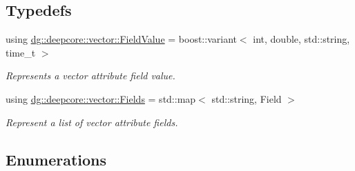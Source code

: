 \subsection*{Typedefs}
\begin{DoxyCompactItemize}
\item 
using \hyperlink{group___vector_module_ga4b8ce414fd5c655308a07474c35828c0}{dg\+::deepcore\+::vector\+::\+Field\+Value} = boost\+::variant$<$ int, double, std\+::string, time\+\_\+t $>$
\begin{DoxyCompactList}\small\item\em Represents a vector attribute field value. \end{DoxyCompactList}\item 
using \hyperlink{group___vector_module_gabeca0d4b0cbea4335ae890255ca59128}{dg\+::deepcore\+::vector\+::\+Fields} = std\+::map$<$ std\+::string, Field $>$
\begin{DoxyCompactList}\small\item\em Represent a list of vector attribute fields. \end{DoxyCompactList}\end{DoxyCompactItemize}
\subsection*{Enumerations}
